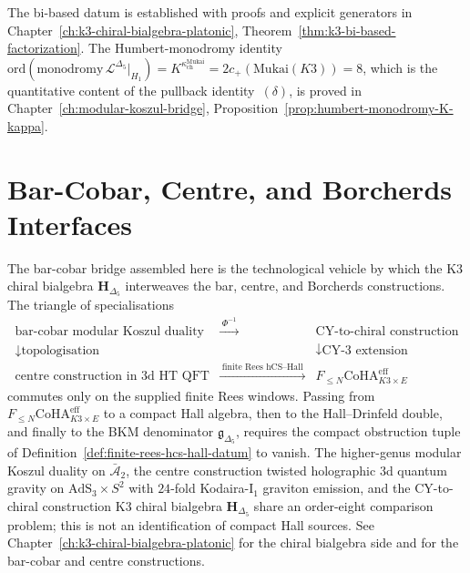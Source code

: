 \begin{remark}
\label{rem:bar-cobar-bi-based-cross-chapter}
The bi-based datum is established with proofs and explicit generators in Chapter~\ref{ch:k3-chiral-bialgebra-platonic}, Theorem~\ref{thm:k3-bi-based-factorization}. The Humbert-monodromy identity $\mathrm{ord}(\mathrm{monodromy}\,\mathcal{L}^{\Delta_5}|_{H_1}) = K^{\kappa_{\mathrm{ch}}^{\mathrm{Mukai}}} = 2c_+(\mathrm{Mukai}(K3)) = 8$, which is the quantitative content of the pullback identity~$(\delta)$, is proved in Chapter~\ref{ch:modular-koszul-bridge}, Proposition~\ref{prop:humbert-monodromy-K-kappa}.
\end{remark}

\section{Bar-Cobar, Centre, and Borcherds Interfaces}
\label{sec:bcbridge-supplement}

\begin{remark}
\label{rem:bcbridge-1}
The bar-cobar bridge assembled here is the technological vehicle by
which the K3 chiral bialgebra $\mathbf H_{\Delta_5}$ interweaves
the bar, centre, and Borcherds constructions. The triangle of specialisations
\[
\begin{array}{ccc}
\text{bar-cobar modular Koszul duality} & \xrightarrow{\;\Phi^{-1}\;} & \text{CY-to-chiral construction} \\
\downarrow{\scriptstyle\text{topologisation}} & & \downarrow{\scriptstyle\text{CY-3 extension}} \\
\text{centre construction in 3d HT QFT} & \xrightarrow{\;\text{finite Rees hCS--Hall}\;} & \text{$F_{\le N}\mathrm{CoHA}_{K3\times E}^{\mathrm{eff}}$}
\end{array}
\]
commutes only on the supplied finite Rees windows. Passing from
\(F_{\le N}\mathrm{CoHA}_{K3\times E}^{\mathrm{eff}}\) to a compact
Hall algebra, then to the Hall--Drinfeld double, and finally to the
BKM denominator \(\mathfrak g_{\Delta_5}\), requires the compact
obstruction tuple of Definition~\ref{def:finite-rees-hcs-hall-datum}
to vanish. The higher-genus modular Koszul duality on
\(\bar{\mathcal A}_2\), the centre construction twisted holographic \(3\)d quantum
gravity on \(\mathrm{AdS}_3\times S^2\) with \(24\)-fold
Kodaira-I$_1$ graviton emission, and the CY-to-chiral construction K3 chiral bialgebra
\(\mathbf H_{\Delta_5}\) share an order-eight comparison problem; this
is not an identification of compact Hall sources. See
Chapter~\ref{ch:k3-chiral-bialgebra-platonic} for the chiral
bialgebra side and \cite{VolI,VolII} for the bar-cobar and centre
constructions.
\end{remark}

